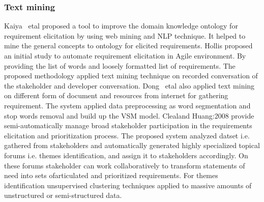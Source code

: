\subsubsection{Text mining} 
 Kaiya ~etal \cite {Kaiya:2010} proposed a
tool to improve the domain knowledge ontology for requirement elicitation by using web mining and NLP
technique. It helped to mine the general
concepts to ontology for elicited requirements.
Hollis \etal\cite{Hollis2017} proposed an initial study to
automate requirement elicitation in Agile environment. By providing the list of
words and loosely formatted list of requirements. The proposed methodology
applied text mining technique on recorded conversation of the stakeholder and
developer conversation. Dong ~etal \cite{dong2010}  also applied text mining on
different form of  document and resources from internet for  gathering
requirement. The system applied data preprocessing as word segmentation and stop
words removal and build up the VSM model.  {Clealand Huang:2008} provide semi-automatically manage broad stakeholder participation in the requirements elicitation and prioritization process. 
The proposed system analyzed  datset i.e. gathered  from stakeholders and automatically generated highly specialized topical forums i.e. themes identification, and assign it to stakeholders accordingly.
 On these forums stakeholder can work collaboratively to transform statements of need into sets ofarticulated and prioritized requirements. For themes identification unsupervised clustering
 techniques applied to massive amounts of unstructured or semi-structured data.  

